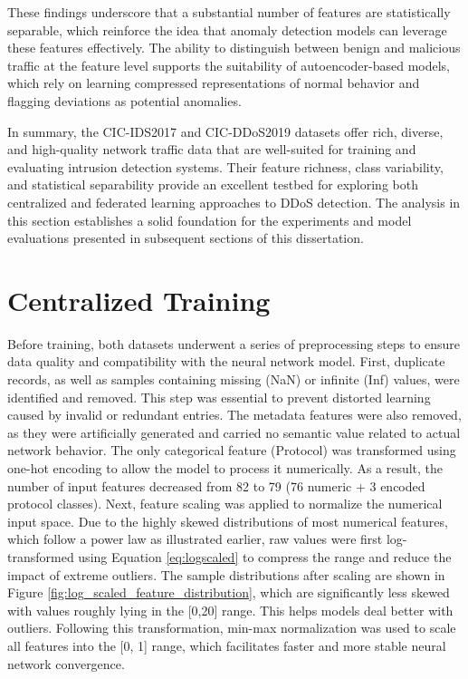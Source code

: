 These findings underscore that a substantial number of features are statistically separable, which reinforce the idea that anomaly detection models can leverage these features effectively. The ability to distinguish between benign and malicious traffic at the feature level supports the suitability of autoencoder-based models, which rely on learning compressed representations of normal behavior and flagging deviations as potential anomalies.

In summary, the CIC-IDS2017 and CIC-DDoS2019 datasets offer rich, diverse, and high-quality network traffic data that are well-suited for training and evaluating intrusion detection systems. Their feature richness, class variability, and statistical separability provide an excellent testbed for exploring both centralized and federated learning approaches to DDoS detection. The analysis in this section establishes a solid foundation for the experiments and model evaluations presented in subsequent sections of this dissertation.

\section{Centralized Training}

Before training, both datasets underwent a series of preprocessing steps to ensure data quality and compatibility with the neural network model. First, duplicate records, as well as samples containing missing (NaN) or infinite (Inf) values, were identified and removed. This step was essential to prevent distorted learning caused by invalid or redundant entries. The metadata features were also removed, as they were artificially generated and carried no semantic value related to actual network behavior. The only categorical feature (Protocol) was transformed using one-hot encoding to allow the model to process it numerically. As a result, the number of input features decreased from 82 to 79 (76 numeric + 3 encoded protocol classes). Next, feature scaling was applied to normalize the numerical input space. Due to the highly skewed distributions of most numerical features, which follow a power law as illustrated earlier, raw values were first log-transformed using Equation \ref{eq:logscaled} to compress the range and reduce the impact of extreme outliers. The sample distributions after scaling are shown in Figure \ref{fig:log_scaled_feature_distribution}, which are significantly less skewed with values roughly lying in the [0,20] range. This helps models deal better with outliers. Following this transformation, min-max normalization was used to scale all features into the [0, 1] range, which facilitates faster and more stable neural network convergence.

